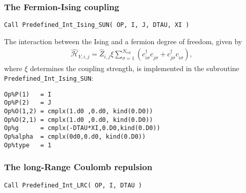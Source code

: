 \subsubsection{The Fermion-Ising coupling}

\begin{lstlisting}[style=fortran]
Call Predefined_Int_Ising_SUN( OP, I, J, DTAU, XI )
\end{lstlisting}

The interaction between the Ising and a fermion degree of freedom, given by
\begin{align}
\hat{\mathcal{H}}_{V,i,j} =
\hat{Z}_{i,j} \xi  \sum_{\sigma=1}^{N_\mathrm{col}}\left( c^{\dagger}_{i \sigma} c^{\phantom\dagger}_{j \sigma} + c^{\dagger}_{j \sigma} c^{\phantom\dagger}_{i \sigma} \right),
\end{align} 
where $\xi$ determines the coupling strength, is implemented in the subroutine \texttt{Predefined\_Int\_Ising\_SUN}:
\begin{lstlisting}[style=fortran]
Op%P(1)   = I
Op%P(2)   = J
Op%O(1,2) = cmplx(1.d0 ,0.d0, kind(0.D0)) 
Op%O(2,1) = cmplx(1.d0 ,0.d0, kind(0.D0)) 
Op%g      = cmplx(-DTAU*XI,0.D0,kind(0.D0))
Op%alpha  = cmplx(0d0,0.d0, kind(0.D0)) 
Op%type   = 1

\end{lstlisting}



\subsubsection{The long-Range Coulomb repulsion}

\begin{lstlisting}[style=fortran]
Call Predefined_Int_LRC( OP, I, DTAU )
\end{lstlisting}

